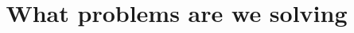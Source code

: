 \documentclass{ximera}
\title{What problems are we solving}
\begin{document}
\begin{abstract}
\end{abstract}
\maketitle
\end{document}
